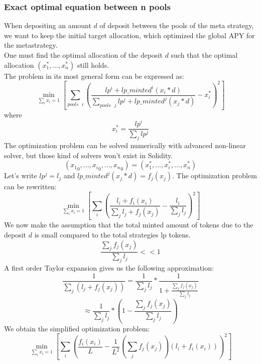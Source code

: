 \documentclass[conference]{IEEEtran}
\begin{document}
\subsubsection{Exact optimal equation between n pools}
When depositing an amount $d$ of deposit between the pools of the meta strategy, we want to keep the initial target allocation, which optimized the global APY for the metastrategy.\\
One must find the optimal allocation of the deposit $d$ such that the optimal allocation $(x_1^*,...,x_n^*)$ still holds.\\
The problem in its most general form can be expressed as:
\begin{equation}
\min_{\sum_{i} x_i = 1} \left[  \sum_{pools\text{ }i}\left(\frac{lp^i + lp\_minted^i(x_i * d)}{\sum_{pools\text{ }j} lp^j +lp\_minted^j(x_j * d)}-x_i^* \right)^2\right]
\end{equation}
where 
$$
x_i^* = \frac{lp^i}{\sum_j lp^j}
$$
The optimization problem can be solved numerically with advanced non-linear solver, but those kind
of solvers won't exist in Solidity.
\begin{equation}
({x_1}_0, ...,{x_i}_0, ...,{x_n}_0) = (x_1^*, ...,x_i^*, ... ,x_n^*)
\end{equation}
Let's write $lp^j = l_j$ and $lp\_minted^j(x_j * d) = f_j(x_j)$. The optimization problem can be rewritten:
\begin{equation}
\min_{\sum_{i} x_i = 1} \left[  \sum_{i}\left(\frac{l_i + f_i(x_i)}{\sum_{j} l_j +f_j(x_j)}- \frac{l_i}{\sum_{j} l_j} \right)^2\right]
\end{equation}
We now make the assumption that the total minted amount of tokens due to the deposit $d$ is small compared to the total strategies lp tokens.
\begin{equation}\label{ref:bigAssumption}
\frac{\sum_{j} f_j(x_j)}{\sum_{j} l_j} << 1
\end{equation}
A first order Taylor expansion gives us the following approximation:
\begin{equation}\label{ref:approximation}
\frac{1}{\sum_{j} (l_j +f_j(x_j))} = \frac{1}{\sum_{j} l_j} * \frac{1}{1 + \frac{\sum_{j} f_j(x_j)}{\sum_{j} l_j}}
\end{equation}
$$
\approx \frac{1}{\sum_{j} l_j} * (1 - \frac{\sum_{j} f_j(x_j)}{\sum_{j} l_j})
$$
We obtain the simplified optimization problem:
\begin{equation}
    \min_{\sum_{i} x_i = 1} \left[ \sum_{i}\left(\frac{f_i(x_i)}{L} - \frac{1}{L^2}(\sum_j f_j(x_j))(l_i+f_i(x_i)) \right)^2\right]
\end{equation}
\end{document}
